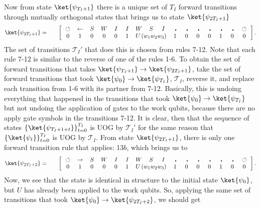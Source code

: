 \documentclass[11pt,letterpaper]{article}
\newcommand{\<}{\langle}
\renewcommand{\>}{\rangle}
\newcommand{\tur}{\,\circlearrowleft\,}   %
\newcommand{\bul}{\:\:\centerdot\:}       %
\newcommand{\iga}{\:I\,}                  %
\newcommand{\wga}{W}						%
\newcommand{\sga}{\:S\,}					%
\begin{document}
Now from state $\ket{\psi_{T_I+1}}$ there is a unique set of $T_I$ forward transitions through mutually orthogonal states that brings us to state $\ket{\psi_{2T_I+1}}$
\begin{eqnarray}
	\ket{\psi_{2T_I+1}} &=& \quad \left[ \begin{array}{cccccccccccccccc}
		\tur & \leftarrow & \sga & \wga & \iga & \iga & 
		\wga & \sga & \iga & \bul &
		\bul & \bul & \bul & \bul & \bul & \tur
		\\		
		0 & 1    & 0    & 0    & 0    & 1    & 
		\multicolumn{3}{c}{U\left(w_1w_2w_3\right)}
		 &
		1    & 0    & 0    & 0    & 1	& 0	& 0
 	\end{array} \right]. \label{psi2tp1}
\end{eqnarray}
The set of transitions $\mathcal{T}_{I}'$ that does this is chosen from rules 7-12. Note that each rule 7-12 is similar to the reverse of one of the rules 1-6. To obtain the set of forward transitions that takes $\ket{\psi_{T_I+1}}\to\ket{\psi_{2T_I+1}}$, take the set of forward transitions that took $\ket{\psi_{0}}\to\ket{\psi_{T_I}}$, $\mathcal{T}_{I}$, reverse it, and replace each transition from 1-6 with its partner from 7-12. Basically, this is undoing everything that happened in the transitions that took $\ket{\psi_{0}}\to\ket{\psi_{T_I}}$ but not undoing the application of gates to the work qubits, because there are no apply gate symbols in the transitions 7-12. It is clear, then that the sequence of states $\left\{ \ket{\psi_{T_I+1+t}} \right\}_{t=0}^{T_I}$ is UOG by $\mathcal{T}_{I}'$ for the same reason that $\left\{ \ket{\psi_{t}} \right\}_{t=0}^{T_I}$ is UOG by $\mathcal{T}_{I}$. From state $\ket{\psi_{2T_I+1}}$, there is only one forward transition rule that applies: 13$b$, which brings us to
\begin{eqnarray}
	\ket{\psi_{2T_I+2}} &=& \quad \left[ \begin{array}{cccccccccccccccc}
		\tur & \rightarrow & \sga & \wga & \iga & \iga & 
		\wga & \sga & \iga & \bul &
		\bul & \bul & \bul & \bul & \bul & \tur
		\\		
		0 & 1    & 0    & 0    & 0    & 1    & 
		\multicolumn{3}{c}{U\left(w_1w_2w_3\right)}
		 &
		1    & 0    & 0    & 0    & 1	& 0	& 0
 	\end{array} \right]. \label{psi2tp2}
\end{eqnarray}
Now, we see that the state is identical in structure to the initial state $\ket{\psi_0}$, but $U$ has already been applied to the work qubits. So, applying the same set of transitions that took $\ket{\psi_0}\to \ket{\psi_{2T_I+2}}$, we should get
\end{document}
